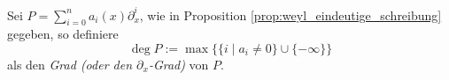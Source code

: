 \begin{comment}
Besser?:\\
erst Filtrierung definieren und dadurch dann den Grad?
\end{comment}
\begin{defn}
Sei $P=\sum_{i=0}^na_i(x)\partial_x^i$, wie in Proposition
\ref{prop:weyl_eindeutige_schreibung} gegeben, so definiere
\[
\deg P:=\max\Big\{\{i\mid a_i\neq 0\}\cup\{-\infty\}\Big\}
\]
als den \emph{Grad (oder den $\partial_x$-Grad)}
von $P$.
\end{defn}
\begin{comment}
In natürlicher Weise erhält man die aufsteigende Filtrierung
$F_N\cD:=\{P\in\cD|\deg P\leq N\}$ mit
\[
\cdots\subset F_{-1}\cD\subset F_{0}\cD\subset
F_{1}\cD\subset\cdots\subset\cD
\]
und erhalte $gr_k^F\cD\bydef F_N\cD\slash F_{N-1}\cD
=\{P\in\cD|\deg P=N\}\cong\C\{x\}$.

\begin{proof}[Beweisidee]
Sei $P\in F_N\cD$, so betrachte den Isomorphismus $F_N\cD\slash
F_{N-1}\cD\rightarrow \C\{x\}$ definiert durch $[P]=P+F_{N-1}\cD\mapsto
a_n(x)$.
\end{proof}

\begin{prop}
Es gilt:
\begin{center}
\begin{tikzpicture} [descr/.style={fill=white,inner sep=2.5pt}]
\matrix (m) [
  matrix of math nodes,
  row sep=1em,
  text height=1.5ex,
  text depth=0.25ex]
{
  gr^F\cD &
  := \bigoplus_{N\in\Z}gr_N^F\cD = \bigoplus_{N\in\N_0}gr_N^F\cD \cong
  \bigoplus_{N\in\N_0}\C\{x\} \cong \C\{x\}[\xi] = &
  \bigoplus_{N\in\N_0}\C\{x\}\cdot \xi^N \\
};
\path[solid]
(m-1-1) edge [bend right=15] node[descr]{$\cong$}
  node[below]{$\mbox{isomorph als grad. Ringe}$} (m-1-3);
\end{tikzpicture}
\end{center}
also $gr^F\cD \cong \bigoplus_{N\in\N_0}\C\{x\}\cdot \xi^N$ als gradierte
Ringe.
\end{prop}
\end{comment}

